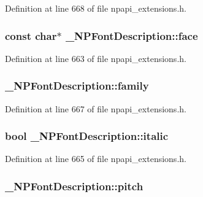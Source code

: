 Definition at line 668 of file npapi\_\-extensions.h.

\hypertarget{struct___n_p_font_description_aeca685fa53dc898a3f38d55dc2cf3941}{
\subsubsection[{face}]{\setlength{\rightskip}{0pt plus 5cm}const char$\ast$ {\bf \_\-NPFontDescription::face}}}
\label{struct___n_p_font_description_aeca685fa53dc898a3f38d55dc2cf3941}


Definition at line 663 of file npapi\_\-extensions.h.

\hypertarget{struct___n_p_font_description_ac78f86d50687284c1b20b3ea05f26501}{
\subsubsection[{family}]{ {\bf \_\-NPFontDescription::family}}}
\label{struct___n_p_font_description_ac78f86d50687284c1b20b3ea05f26501}


Definition at line 667 of file npapi\_\-extensions.h.

\hypertarget{struct___n_p_font_description_aa0b5f70dec32b8a74627b7bc210219f5}{
\subsubsection[{italic}]{\setlength{\rightskip}{0pt plus 5cm}bool {\bf \_\-NPFontDescription::italic}}}
\label{struct___n_p_font_description_aa0b5f70dec32b8a74627b7bc210219f5}


Definition at line 665 of file npapi\_\-extensions.h.

\hypertarget{struct___n_p_font_description_a669fa154e09a6a682c727bf6bccc028b}{
\subsubsection[{pitch}]{ {\bf \_\-NPFontDescription::pitch}}}
\label{struct___n_p_font_description_a669fa154e09a6a682c727bf6bccc028b}


